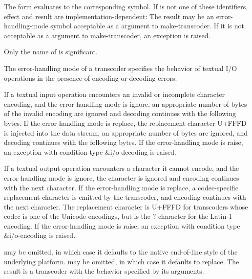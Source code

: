 \begin{entry}{%
}

 The
form evaluates to the corresponding symbol.  If
 is not one of these identifiers,
effect and result are implementation-dependent: The result may be an
error-handling-mode symbol acceptable as a 
argument to {\cf make-transcoder}.  If it is not acceptable as a
 argument to {\cf make-transcoder}, an exception is
raised.

\begin{note}
  Only the name of  is significant.
\end{note}

The error-handling mode of a transcoder specifies the behavior
of textual I/O operations in the presence of encoding or decoding
errors.

If a textual input operation encounters an invalid or incomplete
character encoding, and the error-handling mode is {\cf ignore},
an appropriate number of bytes of the
invalid encoding are ignored and decoding continues with the
following bytes.
If the error-handling mode is {\cf replace}, the replacement
character U+FFFD is injected into the data stream, an appropriate
number of bytes are ignored, and decoding
continues with the following bytes.
If the error-handling mode is {\cf raise}, an 
exception with condition type {\cf\&i/o-decoding} is raised.

If a textual output operation encounters a character it cannot encode,
and the error-handling mode is {\cf ignore}, the character is
ignored and encoding continues with the next character.
If the error-handling mode is {\cf replace}, a codec-specific
replacement character is emitted by the transcoder, and encoding
continues with the next character.
The replacement character is U+FFFD for transcoders whose codec
is one of the Unicode encodings, but is the {\cf ?}
character for the Latin-1 encoding.
If the error-handling mode is {\cf raise}, an
exception with condition type {\cf\&i/o-encoding} is raised.
\end{entry}

\begin{entry}{%
}

   may be omitted, in
which case it defaults to the native end-of-line style of the
underlying platform.   may be omitted, in which
case it defaults to {\cf replace}.  The result is a transcoder with the
behavior specified by its arguments.
\end{entry}

